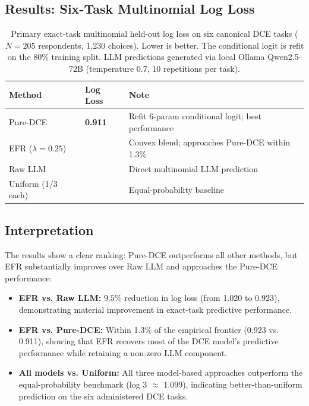 \documentclass[11pt]{article}
\begin{document}
\subsection{Results: Six-Task Multinomial Log Loss}

\begin{table}[h]
\centering
\caption{Primary exact-task multinomial held-out log loss on six canonical DCE tasks ($N = 205$ respondents, 1,230 choices). Lower is better. The conditional logit is refit on the 80\% training split. LLM predictions generated via local Ollama Qwen2.5-72B (temperature 0.7, 10 repetitions per task).}
\label{tab:S17}
\footnotesize
\setlength{\tabcolsep}{5pt}
\renewcommand{\arraystretch}{1.15}
\begin{tabularx}{\textwidth}{@{}>{\raggedright\arraybackslash}p{3.5cm} >{\centering\arraybackslash}p{2cm} >{\raggedright\arraybackslash}X@{}}
\toprule
\textbf{Method} & \textbf{Log Loss} & \textbf{Note} \\
\midrule
Pure-DCE & \textbf{0.911} & Refit 6-param conditional logit; best performance \\
EFR ($\lambda = 0.25$) & 0.923 & Convex blend; approaches Pure-DCE within 1.3\% \\
Raw LLM & 1.020 & Direct multinomial LLM prediction \\
Uniform (1/3 each) & 1.099 & Equal-probability baseline \\
\bottomrule
\end{tabularx}
\end{table}

\subsection{Interpretation}

The results show a clear ranking: Pure-DCE outperforms all other methods, but EFR substantially improves over Raw LLM and approaches the Pure-DCE performance:

\begin{itemize}
\item \textbf{EFR vs. Raw LLM:} $9.5\%$ reduction in log loss (from 1.020 to 0.923), demonstrating material improvement in exact-task predictive performance.
\item \textbf{EFR vs. Pure-DCE:} Within 1.3\% of the empirical frontier (0.923 vs. 0.911), showing that EFR recovers most of the DCE model's predictive performance while retaining a non-zero LLM component.
\item \textbf{All models vs. Uniform:} All three model-based approaches outperform the equal-probability benchmark (log 3 $\approx$ 1.099), indicating better-than-uniform prediction on the six administered DCE tasks.
\end{itemize}
\end{document}
